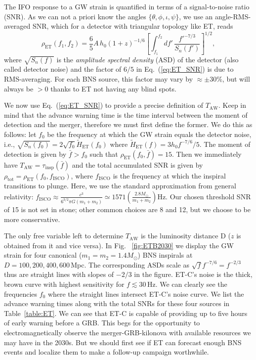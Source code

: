 \documentclass{aa}
\newcommand{\be}{\begin{equation}}
\newcommand{\ee}{\end{equation}}
\newcommand{\f}{\frac}
\begin{document}
The IFO response to a GW strain is quantified in terms of a signal-to-noise ratio (SNR).
As we can not a priori know the angles $\{\theta,\phi,\iota,\psi\}$, we use an angle-RMS-averaged SNR, 
which for a detector with triangular topology like ET, reads
%
\be
\rho_{\text{ET}}(f_1,f_2) = \f{6}{5}A\, h_0  (1+z)^{-1/6} \left[\int_{f_1}^{f_2} d f'\, \f{f'^{-7/3}}{S_n(f')}\right]^{1/2} \label{eq:ET_SNR},
\ee
%
where %
$\sqrt{S_n(f)}$ is the {\it amplitude spectral density} (ASD) of the detector (also called detector noise) and
the factor of $6/5$ in Eq.~(\ref{eq:ET_SNR})
is due to RMS-averaging. %
For each BNS source, this factor may vary by
$\approx \pm 30\%$, but will always be $>0$ thanks to ET not having any blind spots.

We now use Eq.~(\ref{eq:ET_SNR}) to provide a precise definition of $T_\text{AW}$. Keep in mind
that the advance warning time is the time interval between the moment of detection and the merger,
therefore we must first define the former.
We do this as follows: let $f_0$ be the frequency
at which the GW strain equals the detector noise, i.e., $\sqrt{S_n(f_0)}=2\sqrt{f_0} \tilde{H}_\text{ET}(f_0)$ where $\tilde{H}_\text{ET}(f)=3 h_0 f^{-7/6}/5$.
The moment of detection is given by 
$\bar{f}>f_0$ such that $\rho_\text{ET}(f_0,\bar{f})=15$. Then we immediately have
$T_\text{AW} = \tau_\text{insp}(\bar{f})$
and the total accumulated SNR is given by
$\rho_\text{tot}=\rho_\text{ET}(f_0, f_\text{ISCO})$, where
$f_\text{ISCO}$ is the frequency at which the inspiral transitions to plunge. Here, we use the standard approximation from general relativity: $f_\text{ISCO} \approx \tfrac{c^3}{6^{3/2}\pi G (m_1+m_2)} \simeq 1571 \left(\tfrac{2.8M_\odot}{m_1+m_2}\right)\text{Hz}$. Our chosen threshold SNR of 15 is not set in stone;
other common choices are 8 and 12, but we choose to be more conservative.

The only free variable left to determine
$T_\text{AW}$ is the luminosity distance D ($z$ is obtained from it and vice versa). In Fig.~
\ref{fig:ETB2030} we display the GW strain for four canonical ($m_1=m_2=1.4 M_\odot$) BNS inspirals at $D=100,200, 400, 600\,$Mpc. 
The corresponding ASDs scale as $ \sqrt{f} f^{-7/6} = f^{-2/3}$
thus are straight lines with slopes of $-2/3$ in the figure.
ET-C's
noise is the thick, brown curve with highest sensitivity for $f\lesssim 30\,$Hz. We can clearly see the frequencies $f_0$ where the
straight lines intersect ET-C's noise curve.
We list the advance warning times along with the total SNRs for these four sources in  Table~\ref{table:ET}.
We can see that ET-C is capable of providing
up to five hours of early warning before a GRB.
This begs for the opportunity to electromagnetically observe the merger-GRB-kilonova with available
resources we may have in the 2030s.
But we should first see if ET can forecast enough BNS events and localize them to make a follow-up campaign worthwhile.
\end{document}
